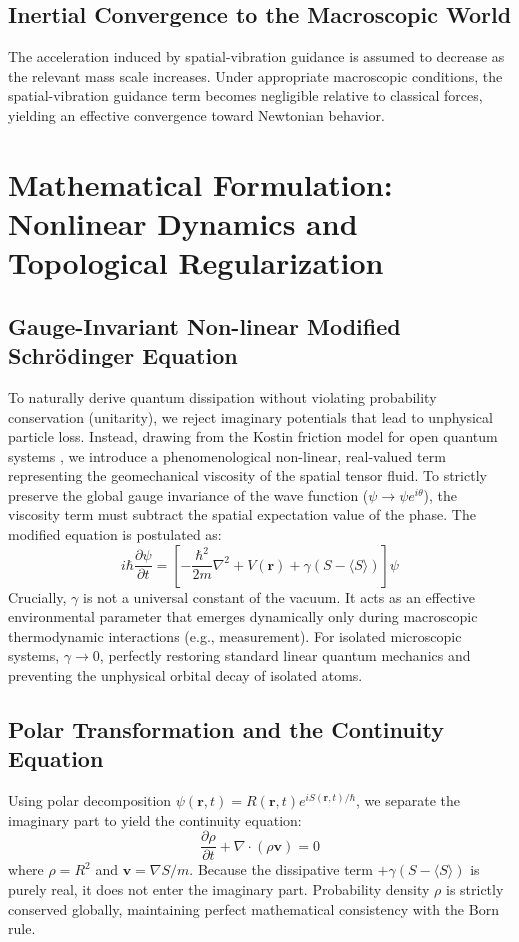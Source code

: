\documentclass[reprint,amsmath,amssymb,aps,prd]{revtex4-2}
\begin{document}
\subsection{Inertial Convergence to the Macroscopic World}
The acceleration induced by spatial-vibration guidance is assumed to decrease as the relevant mass scale increases.
Under appropriate macroscopic conditions, the spatial-vibration guidance term becomes negligible relative to classical forces, yielding an effective convergence toward Newtonian behavior.
\section{Mathematical Formulation: Nonlinear Dynamics and Topological Regularization}

\subsection{Gauge-Invariant Non-linear Modified Schr\"{o}dinger Equation}
To naturally derive quantum dissipation without violating probability conservation (unitarity), we reject imaginary potentials that lead to unphysical particle loss. Instead, drawing from the Kostin friction model for open quantum systems \cite{Kostin1972}, we introduce a phenomenological non-linear, real-valued term representing the geomechanical viscosity of the spatial tensor fluid. To strictly preserve the global gauge invariance of the wave function ($\psi \to \psi e^{i\theta}$), the viscosity term must subtract the spatial expectation value of the phase. The modified equation is postulated as:
\begin{equation}
i\hbar \frac{\partial \psi}{\partial t} = \left[ -\frac{\hbar^2}{2m} \nabla^2 + V(\mathbf{r}) + \gamma(S - \langle S \rangle) \right] \psi
\end{equation}
Crucially, $\gamma$ is not a universal constant of the vacuum.
It acts as an effective environmental parameter that emerges dynamically only during macroscopic thermodynamic interactions (e.g., measurement).
For isolated microscopic systems, $\gamma \to 0$, perfectly restoring standard linear quantum mechanics and preventing the unphysical orbital decay of isolated atoms.
\subsection{Polar Transformation and the Continuity Equation}
Using polar decomposition $\psi(\mathbf{r}, t) = R(\mathbf{r}, t) e^{iS(\mathbf{r}, t)/\hbar}$, we separate the imaginary part to yield the continuity equation:
\begin{equation}
\frac{\partial \rho}{\partial t} + \nabla \cdot (\rho \mathbf{v}) = 0
\end{equation}
where $\rho = R^2$ and $\mathbf{v} = \nabla S / m$.
Because the dissipative term $+\gamma(S - \langle S \rangle)$ is purely real, it does not enter the imaginary part.
Probability density $\rho$ is strictly conserved globally, maintaining perfect mathematical consistency with the Born rule.
\end{document}

